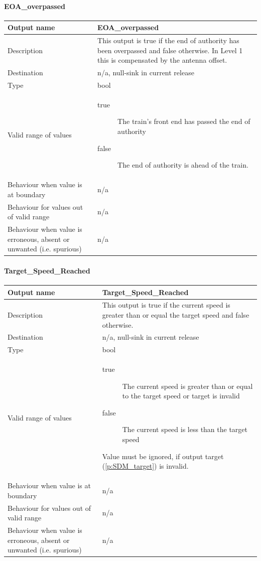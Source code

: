 \paragraph{EOA\_overpassed}

\begin{longtable}{p{}p{}}
\toprule
Output name				& EOA\_overpassed \\
\midrule
Description				& This output is true if the end of authority has been overpassed and false otherwise. In Level 1 this is compensated by the antenna offset.\\
\midrule
Destination				& n/a, null-sink in current release \\ 
\midrule
Type					& bool \\
\midrule
Valid range of values	& \begin{description}
                            \item[true] The train's front end has passed the end of authority
                            \item[false] The end of authority is ahead of the train.
                          \end{description}\\
\midrule
Behaviour when value is at boundary	& n/a \\
\midrule
Behaviour for values out of valid range	& n/a \\
\midrule
Behaviour when value is erroneous, absent or unwanted (i.e. spurious) & n/a \\
\bottomrule
\end{longtable}


\paragraph{Target\_Speed\_Reached}

\begin{longtable}{p{}p{}}
\toprule
Output name				& Target\_Speed\_Reached \\
\midrule
Description				& This output is true if the current speed is greater than or equal the target speed and false otherwise. \\
\midrule
Destination				& n/a, null-sink in current release \\ 
\midrule
Type					& bool \\
\midrule
Valid range of values	&
\begin{description}
\item[true] The current speed is greater than or equal to the target speed or target is invalid
\item[false] The current speed is less than the target speed
\end{description}
Value must be ignored, if output target (\ref{p:SDM_target}) is invalid.\\
\midrule
Behaviour when value is at boundary	& n/a \\
\midrule
Behaviour for values out of valid range	& n/a \\
\midrule
Behaviour when value is erroneous, absent or unwanted (i.e. spurious) & n/a \\
\bottomrule
\end{longtable}


